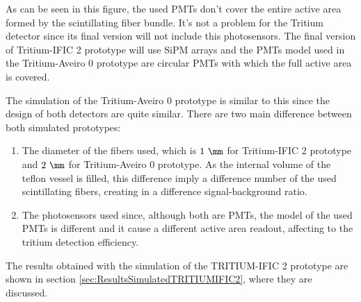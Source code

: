 As can be seen in this figure, the used PMTs don't cover the entire active area formed by the scintillating fiber bundle. It's not a problem for the Tritium detector since its final version will not include this photosensors. The final version of Tritium-IFIC 2 prototype will use SiPM arrays and the PMTs model used in the Tritium-Aveiro 0 prototype are circular PMTs with which the full active area is covered.

The simulation of the Tritium-Aveiro 0 prototype is similar to this since the design of both detectors are quite similar. There are two main difference between both simulated prototypes:

\begin{enumerate}

\item{} The diameter of the fibers used, which is $1~\mm$ for Tritium-IFIC 2 prototype and $2~\mm$ for Tritium-Aveiro 0 prototype. As the internal volume of the teflon vessel is filled, this difference imply a difference number of the used scintillating fibers, creating in a difference signal-background ratio.

\item{} The photosensors used since, although both are PMTs, the model of the used PMTs is different and it cause a different active area readout, affecting to the tritium detection efficiency. 

\end{enumerate}

The results obtained with the simulation of the TRITIUM-IFIC 2 prototype are shown in section \ref{sec:ResultsSimulatedTRITIUMIFIC2}, where they are discussed.